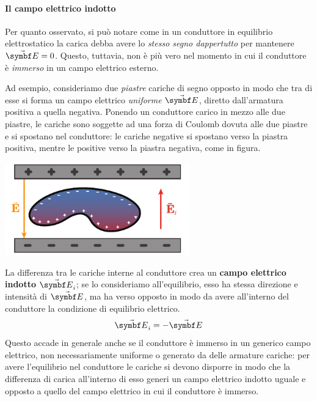 \paragraph{Il campo elettrico indotto}
Per quanto osservato, si può notare come in un conduttore in equilibrio elettrostatico la carica debba avere lo \textit{stesso segno dappertutto} per mantenere $\vba{E}=0$. Questo, tuttavia, non è più vero nel momento in cui il conduttore è \textit{immerso} in un campo elettrico esterno.

Ad esempio, consideriamo due \textit{piastre} cariche di segno opposto in modo che tra di esse si forma un campo elettrico \textit{uniforme} $\vba{E}$, diretto dall'armatura positiva a quella negativa.
Ponendo un conduttore carico in mezzo alle due piastre, le cariche sono soggette ad una forza di Coulomb dovuta alle due piastre e si spostano nel conduttore: le cariche negative si spostano verso la piastra positiva, mentre le positive verso la piastra negativa, come in figura.
\begin{center}
	\includegraphics[width=0.6\textwidth]{images/chp4/chp4campoindotto.pdf}
\end{center}
La differenza tra le cariche interne al conduttore crea un \textbf{campo elettrico indotto} $\vba{E}_i$; se lo consideriamo all'equilibrio, esso ha stessa direzione e intensità di $\vba{E}$, ma ha verso opposto in modo da avere all'interno del conduttore la condizione di equilibrio elettrico.
\begin{equation}
	\vba{E}_i=-\vba{E}
\end{equation}
Questo accade in generale anche se il conduttore è immerso in un generico campo elettrico, non necessariamente uniforme o generato da delle armature cariche: per avere l'equilibrio nel conduttore le cariche si devono disporre in modo che la differenza di carica all'interno di esso generi un campo elettrico indotto uguale e opposto a quello del campo elettrico in cui il conduttore è immerso.
